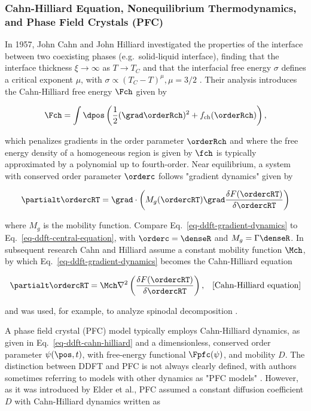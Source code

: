 \subsubsection{Cahn-Hilliard Equation, Nonequilibrium Thermodynamics, and Phase Field Crystals (PFC)}

In 1957, John Cahn and John Hilliard investigated the properties of the interface between two coexisting phases (e.g.\ solid-liquid interface), finding that the interface thickness $\xi \rightarrow \infty$ as $T \rightarrow T_C$ and that the interfacial free energy $\sigma$ defines a critical exponent $\mu$, with $\sigma \propto (T_C - T)^\mu, \mu = 3/2$ \cite{cahn1958free}.  Their analysis introduces the Cahn-Hilliard free energy $\Fch$ given by

\begin{equation}
\Fch = \int \dpos \left( \frac{1}{2}(\grad \orderRch)^2 + f_\text{ch}(\orderRch) \right),
\end{equation}

which penalizes gradients in the order parameter $\orderRch$ and where the free energy density of a homogeneous region is given by $\fch$ is typically approximated by a polynomial up to fourth-order.  Near equilibrium, a system with conserved order parameter $\orderc$ follows "gradient dynamics" given by

\begin{equation}
\partialt \ordercRT = \grad \cdot \left( M_g(\ordercRT) \grad \frac{\delta F(\ordercRT)}{\delta \ordercRT} \right)
\label{eq-ddft-gradient-dynamics}
\end{equation}

where $M_g$ is the mobility function.  Compare Eq.~\ref{eq-ddft-gradient-dynamics} to Eq.~\ref{eq-ddft-central-equation}, with $\orderc = \denseR$ and $M_g = \Gamma \denseR$.  In subsequent research Cahn and Hilliard assume a constant mobility function $\Mch$, by which Eq.~\ref{eq-ddft-gradient-dynamics} becomes the Cahn-Hilliard equation

\begin{align}
\partialt \ordercRT = \Mch \nabla^2 \left( \frac{\delta F(\ordercRT)}{\delta \ordercRT} \right), & & \text{[Cahn-Hilliard equation]}
\label{eq-ddft-cahn-hilliard}
\end{align}

and was used, for example, to analyze spinodal decomposition \cite{cahn1965phase}.

A phase field crystal (PFC) model typically employs Cahn-Hilliard dynamics, as given in Eq.~\ref{eq-ddft-cahn-hilliard} and a dimensionless, conserved order parameter $\psi(\pos, t)$, with free-energy functional $\Fpfc(\psi)$, and mobility $D$.  The distinction between DDFT and PFC is not always clearly defined, with authors sometimes referring to models with other dynamics as "PFC models" \cite{archer2012}.  However, as it was introduced by Elder et al., PFC assumed a constant diffusion coefficient $D$ with Cahn-Hilliard dynamics written as

